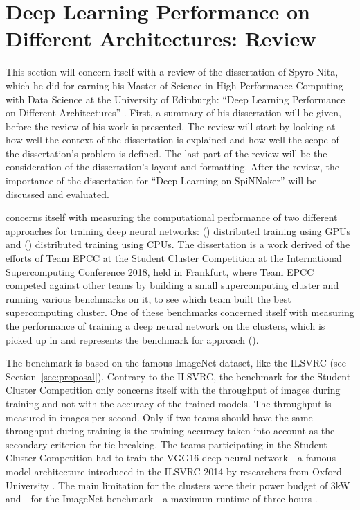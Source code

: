 \documentclass{article}
\begin{document}

\section{Deep Learning Performance on Different %
  Architectures: Review}
\label{sec:review}

This section will concern itself with a review of the
dissertation of Spyro Nita, which he did for earning his
Master of Science in High Performance Computing with Data
Science at the University of Edinburgh:
``Deep Learning Performance on Different Architectures''
 \citep{nita_2018}.
First, a summary of his dissertation will be given, before
the review of his work is presented.
The review will start by looking at how well the context
of the dissertation is explained and how well the scope
of the dissertation's problem is defined.
The last part of the review will be the consideration of
the dissertation's layout and formatting.
After the review, the importance of the dissertation for
``Deep Learning on SpiNNaker'' will be discussed and
evaluated.

\citet{nita_2018} concerns itself with measuring the
computational performance of two different approaches for
training deep neural networks: ()
distributed training using GPUs and ()
distributed training using CPUs.
The dissertation is a work derived of the efforts of
Team EPCC at the Student Cluster Competition at the
International Supercomputing Conference 2018, held in
Frankfurt, where Team EPCC competed against other teams by
building a small supercomputing cluster and running various
benchmarks on it, to see which team built the best
supercomputing cluster.
One of these benchmarks concerned itself with measuring the
performance of training a deep neural network on the
clusters, which is picked up in \citet{nita_2018} and
represents the benchmark for approach ().


The benchmark is based on the famous ImageNet dataset, like
the ILSVRC (see Section~\ref{sec:proposal}).
Contrary to the ILSVRC, the benchmark for the Student
Cluster Competition only concerns itself with the
throughput of images during training and not with the
accuracy of the trained models.
The throughput is measured in images per second.
Only if two teams should have the same throughput during
training is the training accuracy taken into account as
the secondary criterion for tie-breaking.
The teams participating in the Student Cluster Competition
had to train the VGG16 deep neural network---a famous
model architecture introduced in the ILSVRC 2014 by
researchers from Oxford University
\citep{simonyan_et_al_2014}.
The main limitation for the clusters were their power
budget of 3kW and---for the ImageNet benchmark---a maximum
runtime of three hours \citep{nita_2018}.
\end{document}
